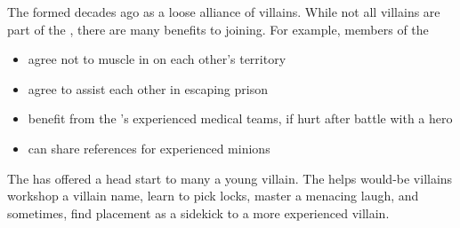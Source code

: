 \documentclass[blue]{LRSguildcamp1}
\begin{document}
\name{\bVillainCompact{}}

The \cVillainCompact{\intro} formed decades ago as a loose alliance of villains.  While not all villains are part of the \cVillainCompact{}, there are many benefits to joining.  For example, members of the \cVillainCompact{}

\begin{itemize}
\item agree not to muscle in on each other's territory
\item agree to assist each other in escaping prison
\item benefit from the \cVillainCompact{}'s experienced medical teams, if hurt after battle with a hero
\item can share references for experienced minions
\end{itemize}

The \cVillainCompact{} has offered a head start to many a young villain.  The \cVillainCompact{} helps would-be villains workshop a villain name, learn to pick locks, master a menacing laugh, and sometimes, find placement as a sidekick to a more experienced villain.
\end{document}
